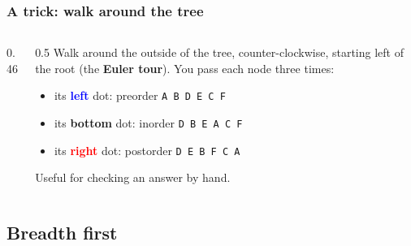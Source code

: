 \documentclass[aspectratio=169,10pt,compress]{beamer}
\begin{document}
\begin{frame}[t,fragile] \frametitle{A trick: walk around the tree}
  \begin{columns}[T]
    \begin{column}{0.46\textwidth}
      \begin{center}
      \end{center}
    \end{column}
    \begin{column}{0.5\textwidth}
      Walk around the outside of the tree, counter-clockwise, starting left of the root (the \textbf{Euler tour}). You pass each node three times:
      \begin{itemize}\small
        \item its \textcolor{blue}{\textbf{left}} dot: preorder \texttt{A B D E C F}
        \item its \textcolor{green!60!black}{\textbf{bottom}} dot: inorder \texttt{D B E A C F}
        \item its \textcolor{red}{\textbf{right}} dot: postorder \texttt{D E B F C A}
      \end{itemize}
      \small Useful for checking an answer by hand.
    \end{column}
  \end{columns}
\end{frame}

\subsection[Breadth first]{Breadth first}
\end{document}

